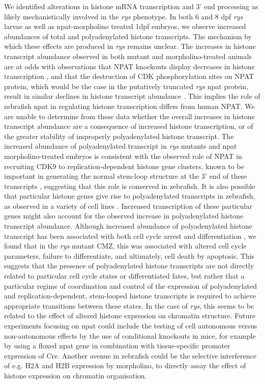 We identified alterations in histone mRNA transcription and 3’ end processing as likely mechanistically involved in the \textit{rys} phenotype. In both 6 and 8 dpf \textit{rys} larvae as well as npat-morpholino treated 1dpf embryos, we observe increased abundances of total and polyadenylated histone transcripts. The mechanism by which these effects are produced in \textit{rys} remains unclear. The increases in histone transcript abundance observed in both mutant and morpholino-treated animals are at odds with observations that NPAT knockouts display decreases in histone transcription \cite{Ye2003}, and that the destruction of CDK phosphorylation sites on NPAT protein, which would be the case in the putatively truncated \textit{rys} npat protein, result in similar declines in histone transcript abundance \cite{Ma2000,Mitra2009}. This implies the role of zebrafish npat in regulating histone transcription differs from human NPAT. We are unable to determine from these data whether the overall increases in histone transcript abundance are a consequence of increased histone transcription, or of the greater stability of improperly polyadenylated histone transcript. The increased abundance of polyadenylated transcript in \textit{rys} mutants and npat morpholino-treated embryos is consistent with the observed role of NPAT in recruiting CDK9 to replication-dependent histone gene clusters, known to be important in generating the normal stem-loop structure at the 3’ end of these transcripts \cite{Pirngruber2009}, suggesting that this role is conserved in zebrafish. It is also possible that particular histone genes give rise to polyadenylated transcripts in zebrafish, as observed in a variety of cell lines \cite{Kari2013}. Increased transcription of these particular genes might also account for the observed increase in polyadenylated histone transcript abundance. Although increased abundance of polyadenylated histone transcript has been associated with both cell cycle arrest and differentiation \cite{Kari2013}, we found that in the \textit{rys} mutant CMZ, this was associated with altered cell cycle parameters, failure to differentiate, and ultimately, cell death by apoptosis. This suggests that the presence of polyadenylated histone transcripts are not directly related to particular cell cycle states or differentiated fates, but rather that a particular regime of coordination and control of the expression of polyadenylated and replication-dependent, stem-looped histone transcripts is required to achieve appropriate transitions between these states. In the case of \textit{rys}, this seems to be related to the effect of altered histone expression on chromatin structure. Future experiments focusing on npat could include the testing of cell autonomous versus non-autonomous effects by the use of conditional knockouts in mice, for example by using a floxed npat gene in combination with tissue-specific promoter expression of Cre. Another avenue in zebrafish could be the selective interference of e.g. H2A and H2B expression by morpholino, to directly assay the effect of histone expression on chromatin organisation.